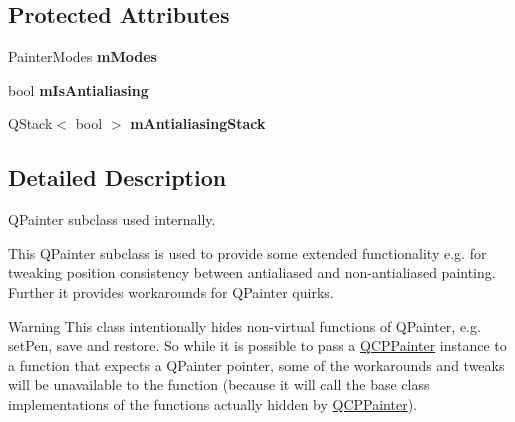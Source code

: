 \subsection*{\-Protected \-Attributes}
\begin{DoxyCompactItemize}
\item 
\hypertarget{classQCPPainter_af5d1d6e5df0adbc7de5633250fb3396c}{\-Painter\-Modes {\bfseries m\-Modes}}\label{classQCPPainter_af5d1d6e5df0adbc7de5633250fb3396c}

\item 
\hypertarget{classQCPPainter_a7055085da176aee0f6b23298f1003d08}{bool {\bfseries m\-Is\-Antialiasing}}\label{classQCPPainter_a7055085da176aee0f6b23298f1003d08}

\item 
\hypertarget{classQCPPainter_a0189e641bbf7dc31ac15aef7b36501fa}{\-Q\-Stack$<$ bool $>$ {\bfseries m\-Antialiasing\-Stack}}\label{classQCPPainter_a0189e641bbf7dc31ac15aef7b36501fa}

\end{DoxyCompactItemize}


\subsection{\-Detailed \-Description}
\-Q\-Painter subclass used internally. 

\-This \-Q\-Painter subclass is used to provide some extended functionality e.\-g. for tweaking position consistency between antialiased and non-\/antialiased painting. \-Further it provides workarounds for \-Q\-Painter quirks.

\begin{DoxyWarning}{\-Warning}
\-This class intentionally hides non-\/virtual functions of \-Q\-Painter, e.\-g. set\-Pen, save and restore. \-So while it is possible to pass a \hyperlink{classQCPPainter}{\-Q\-C\-P\-Painter} instance to a function that expects a \-Q\-Painter pointer, some of the workarounds and tweaks will be unavailable to the function (because it will call the base class implementations of the functions actually hidden by \hyperlink{classQCPPainter}{\-Q\-C\-P\-Painter}). 
\end{DoxyWarning}


